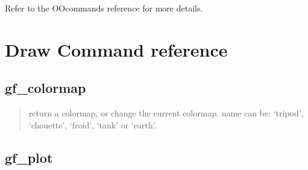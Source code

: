 \documentclass[a4paper,11pt,english]{sphinxmanual}
\begin{document}
Refer to the OO\sphinxhyphen{}commands reference {\hyperref[\detokenize{matlab_octave/oocmd:mlab-oocmd}]{}} for more details.


\chapter{Draw Command reference}
\label{\detokenize{matlab_octave/plotcmdref:draw-command-reference}}\label{\detokenize{matlab_octave/plotcmdref:mlab-plotcmdref}}\label{\detokenize{matlab_octave/plotcmdref::doc}}

\section{gf\_colormap}
\label{\detokenize{matlab_octave/plotcmdref:gf-colormap}}

\begin{sphinxVerbatim}[commandchars=\\\{\}]
\end{sphinxVerbatim}

\begin{quote}

return a colormap, or change the current colormap.
name can be: ‘tripod’, ‘chouette’, ‘froid’, ‘tank’
or ‘earth’.
\end{quote}


\section{gf\_plot}
\label{\detokenize{matlab_octave/plotcmdref:gf-plot}}
\end{document}
